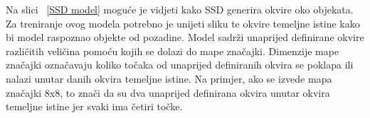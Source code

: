 Na slici ~\ref{SSD model} moguće je vidjeti kako SSD generira okvire oko objekata. Za treniranje ovog modela potrebno je unijeti sliku
te okvire temeljne istine kako bi model raspoznao objekte od pozadine. Model sadrži unaprijed definirane okvire različitih veličina pomoću kojih 
se dolazi do mape značajki. Dimenzije mape značajki označavaju koliko točaka od unaprijed definiranih okvira se poklapa ili nalazi unutar danih okvira temeljne istine.
Na primjer, ako se izvede mapa značajki 8x8, to znači da su dva unaprijed definirana okvira unutar okvira temeljne istine jer svaki ima četiri točke. \citep{DBLP:journals/corr/LiuAESR15}

